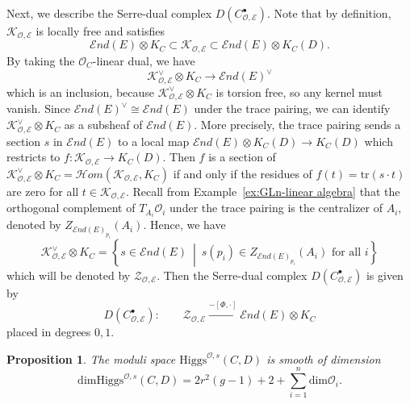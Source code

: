 \documentclass[11pt]{amsart}
\theoremstyle{plain}
\newtheorem{proposition}[theorem]{Proposition}
\theoremstyle{definition}
\theoremstyle{remark}
\newcommand{\End}{\mathcal E nd}
\newcommand{\cO}{\mathcal O}
\newcommand{\cK}{\mathcal K}
\newcommand{\Higgs}{\mathrm{Higgs}}
\newcommand{\tr}{\mathrm{tr}}
\def\dim{\mathrm{dim}}
\begin{document}
Next, we describe the Serre-dual complex $D(C^\bullet_{\cO,\mathcal{E}})$. Note that by definition, $\cK_{\cO, \mathcal{E}}$ is locally free and satisfies
\[ \End(E)\otimes K_C \subset \cK_{\cO, \mathcal{E}} \subset \End(E)\otimes K_C(D). \] By taking the $\cO_C$-linear dual, we have 
\[\cK^{\vee}_{\cO, \mathcal{E}}\otimes K_C\to \End(E)^\vee  \] 
which is an inclusion, because $\cK^{\vee}_{\cO, \mathcal{E}}\otimes K_C$ is torsion free, so any kernel must vanish. Since $\End(E)^\vee\cong \End(E)$ under the trace pairing, we can identify $\cK^{\vee}_{\cO, \mathcal{E}}\otimes K_C$ as a subsheaf of $\End(E)$. More precisely, the trace pairing sends a section $s$ in $\End(E)$ to a local map $\End(E)\otimes K_C(D)\to K_C(D)$ which restricts to $f:\cK_{\cO,\mathcal E}\to K_C(D)$. Then $f$ is a section of $\cK_{\cO,\mathcal E}^\vee\otimes K_C= \mathcal Hom(\cK_{\cO, \mathcal E}, K_C)$ if and only if the residues of $f(t) = \tr(s\cdot t)$ are zero for all $t\in \cK_{\cO,\mathcal E}$. Recall from Example~\ref{ex:GLn-linear algebra} that the orthogonal complement of $T_{A_i}\cO_i$ under the trace pairing is the centralizer of $A_i$, denoted by $Z_{\End(E)_{p_i}}(A_i)$. Hence, we have
\[
\mathcal{K}_{\cO,\mathcal{E}}^\vee \otimes K_C=\left\{s \in \End(E) \ \middle|\ s(p_i) \in Z_{\End(E)_{p_i}}(A_i)\text{ for all } i\right\}
\]
which will be denoted by $\mathcal{Z}_{\cO,\mathcal{E}}$. Then the Serre-dual complex  $D(C^\bullet_{\cO,\mathcal{E}})$ is given by 
\[
D(C^\bullet_{\cO,\mathcal{E}}): \qquad \mathcal{Z}_{\cO,\mathcal{E}} \xrightarrow{-[\Phi, \cdot]} \End(E)\otimes K_C
\]
placed in degrees $0,1$. 

\begin{proposition}\label{prop:smooth-HiggsO}
	The moduli space $\Higgs^{\cO,s}(C,D)$ is smooth of dimension
	\[
	\dim \Higgs^{\cO,s}(C,D)
	=
	2r^2(g-1)+2+\sum_{i=1}^n\dim\cO_i.
	\]
\end{proposition}
\end{document}
